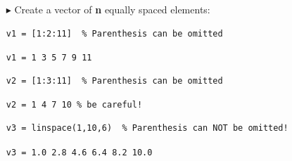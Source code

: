\documentclass[aspectratio=169]{beamer}
\begin{document}
\begin{frame}[fragile]{}
    \begin{itemize}
        \item[$\blacktriangleright$]
        Create a vector of \textbf{n} equally spaced elements:
        \begin{verbatim}
v1 = [1:2:11]  % Parenthesis can be omitted
        \end{verbatim}
        \vspace{2mm}
        \texttt{v1 = \hspace{2em} 1 \hspace{2em} 3 \hspace{2em} 5 \hspace{2em} 7 \hspace{2em} 9 \hspace{2em} 11}
        \vspace{4mm}
        
        \begin{verbatim}
v2 = [1:3:11]  % Parenthesis can be omitted
        \end{verbatim}
        \vspace{2mm}
        \texttt{v2 = \hspace{2em} 1 \hspace{2em} 4 \hspace{2em} 7 \hspace{2em} 10 \hspace{1.em} \alert{\% be careful!}} \\
        \vspace{2mm}

        \begin{verbatim}
v3 = linspace(1,10,6)  % Parenthesis can NOT be omitted!
        \end{verbatim}
        \vspace{2mm}
        \texttt{v3 = \hspace{2em} 1.0 \hspace{2em} 2.8 \hspace{2em} 4.6 \hspace{2em} 6.4 \hspace{2em} 8.2 \hspace{2em} 10.0}
    \end{itemize}
\end{frame}
 
\end{document}
